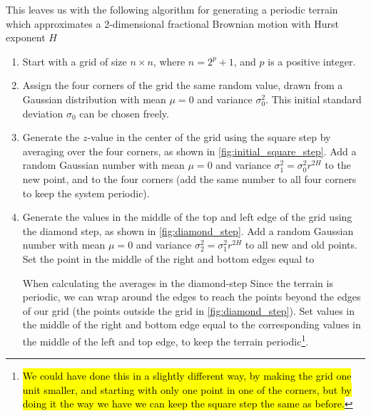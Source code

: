 This leaves us with the following algorithm for generating a periodic terrain which approximates a 2-dimensional fractional Brownian motion with Hurst exponent $H$
\begin{enumerate}
    \item Start with a grid of size $n \times n$, where $n = 2^p + 1$, and $p$ is a positive integer.
    
    \item Assign the four corners of the grid the same random value, drawn from a Gaussian distribution with mean $\mu = 0$ and variance $\sigma_0^2$. This initial standard deviation $\sigma_0$ can be chosen freely.
    
    \item Generate the $z$-value in the center of the grid using the square step by averaging over the four corners, as shown in \cref{fig:initial_square_step}. Add a random Gaussian number with mean $\mu = 0$ and variance $\sigma_1^2 = \sigma_0^2r^{2H}$ to the new point, and to the four corners (add the same number to all four corners to keep the system periodic).
    
    \item Generate the values in the middle of the top and left edge of the grid using the diamond step, as shown in \cref{fig:diamond_step}. Add a random Gaussian number with mean $\mu = 0$ and variance $\sigma_2^2 = \sigma_1^2r^{2H}$ to all new and old points. Set the point in the middle of the right and bottom edges equal to 
    
    When calculating the averages in the diamond-step  Since the terrain is periodic, we can wrap around the edges to reach the points beyond the edges of our grid (the points outside the grid in \cref{fig:diamond_step}). Set values in the middle of the right and bottom edge equal to the corresponding values in the middle of the left and top edge, to keep the terrain periodic\footnote{\hl{We could have done this in a slightly different way, by making the grid one unit smaller, and starting with only one point in one of the corners, but by doing it the way we have we can keep the square step the same as before.}}.
    
    

\end{enumerate}
